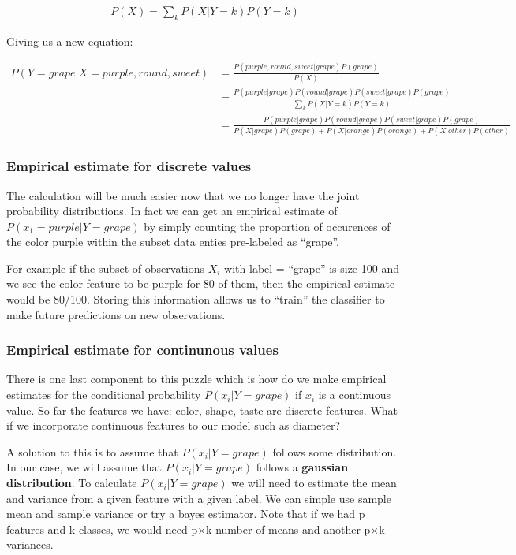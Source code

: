 \documentclass{article}
\begin{document}
\begin{align*}
P(X) = \sum_{k} P(X|Y=k)P(Y=k)
\end{align*}

Giving us a new equation:

\begin{align*}
P(Y=grape|X=purple,round,sweet)&= \frac{P(purple,round,sweet|grape)P(grape)}{P(X)}\\
&= \frac{P(purple|grape)P(round|grape)P(sweet|grape)P(grape)}{\sum_{k} P(X|Y=k)P(Y=k)}\\
&= \frac{P(purple|grape)P(round|grape)P(sweet|grape)P(grape)}{P(X|grape)P(grape)+P(X|orange)P(orange)+P(X|other)P(other)}
\end{align*}

\subsubsection{Empirical estimate for discrete values}
The calculation will be much easier now that we no longer have the joint probability distributions. In fact we can get an empirical estimate of $P(x_{1} = purple|Y=grape)$ by simply counting the proportion of occurences of the color purple within the subset data enties pre-labeled as ``grape''.\newline

For example if the subset of observations $X_{i}$ with label = ``grape'' is size 100 and we see the color feature to be purple for 80 of them, then the empirical estimate would be 80/100. Storing this information allows us to ``train'' the classifier to make future predictions on new observations. 
\subsubsection{Empirical estimate for continunous values}
There is one last component to this puzzle which is how do we make empirical estimates for the conditional probability $P(x_{i}|Y=grape)$ if $x_{i}$ is a continuous value. So far the features we have: color, shape, taste are discrete features. What if we incorporate continuous features to our model such as diameter?\newline

A solution to this is to assume that $P(x_{i}|Y=grape)$ follows some distribution. In our case, we will assume that $P(x_{i}|Y=grape)$ follows a \textbf{gaussian distribution}. To calculate $P(x_{i}|Y=grape)$ we will need to estimate the mean and variance from a given feature with a given label. We can simple use sample mean and sample variance or try a bayes estimator. Note that if we had p features and k classes, we would need p$\times$k number of means and another p$\times$k variances.\newline
\end{document}

